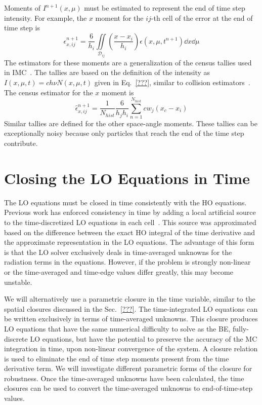Moments of $I^{n+1}(x,\mu)$ must be estimated to represent the end of time step intensity.
For example, the $x$ moment for the $ij$-th cell of the error at the end of time step is
\begin{equation}
    \epsilon^{n+1}_{x,ij} = \frac{6}{h_i} \iint\limits_{\mathcal{D}_{ij}} \left(\frac{x
    - x_i}{h_i}\right) \epsilon(x,\mu,t^{n+1}) \dd x \dd \mu
\end{equation}
The estimators for these moments are a generalization of the census
tallies used in IMC~\cite{wollaber_review,wollaber_thesis}.  The tallies are based on the
definition of the intensity as $I(x,\mu,t) = c h \nu N(x,\mu,t)$ given in
Eq.~\eqref{???}, similar to collision estimators~\cite{shultis_mc,mcnp}.  The census estimator for the $x$ moment is
\begin{equation}
    \hat\epsilon^{n+1}_{x,ij} = \frac{1}{N_{hist}} \frac{6}{h_j h_i} \sum_{n=1}^{N_{hist}}
    c w_j  \left(x_{c} - x_{i}\right)
\end{equation}
Similar tallies are defined for the other space-angle moments. These tallies can be
exceptionally noisy because only particles that reach the end of the time step contribute.


\section{Closing the LO Equations in Time}

The LO equations must be closed in time consistently with the HO
equations.   Previous work has enforced
consistency in time by adding a local artificial source to the time-discretized LO
equations in each cell~\cite{holo_rh}.  This
source was approximated based on the difference between the exact HO integral of the time
derivative and the approximate representation in the LO equations. The advantage
of this form is that the LO solver exclusively deals in
time-averaged unknowns for the radiation terms in the equations.  However, if the problem
is strongly non-linear or the time-averaged and time-edge
values differ greatly, this may become unstable.

We will alternatively use a
parametric closure in the time variable, similar to the spatial closures discussed in the
Sec.~\ref{???}.  The time-integrated LO equations can be written exclusively in terms
of time-averaged unknowns.  This closure
produces LO equations that have the same numerical difficulty to solve as the BE,
fully-discrete LO equations, but
have the potential to preserve the accuracy of the MC integration in time, upon non-linear
convergence of the system.   A closure relation is used to eliminate
the end of time step moments present from the time derivative term.   We will investigate different parametric forms of the closure for robustness.   Once the time-averaged unknowns have been calculated,
the time closures can be used to convert the time-averaged unknowns to end-of-time-step
values.

